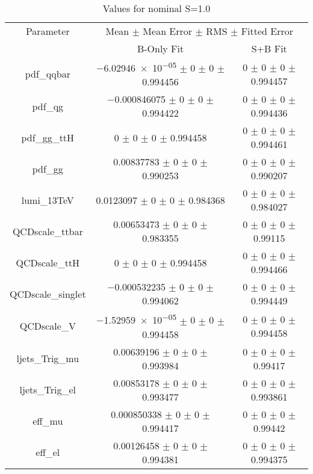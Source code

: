 \begin{table}
\centering
\caption{Values for nominal S=1.0}
\begin{tabular}{ccc}
\toprule
Parameter & \multicolumn{2}{c}{Mean $\pm$ Mean Error $\pm$ RMS $\pm$ Fitted Error}\\
 & B-Only Fit & S+B Fit\\
\midrule
pdf\_qqbar & \num{-6.02946e-05} $\pm$ \num{0} $\pm$ \num{0} $\pm$ \num{0.994456} & \num{0} $\pm$ \num{0} $\pm$ \num{0} $\pm$ \num{0.994457}\\
pdf\_qg & \num{-0.000846075} $\pm$ \num{0} $\pm$ \num{0} $\pm$ \num{0.994422} & \num{0} $\pm$ \num{0} $\pm$ \num{0} $\pm$ \num{0.994436}\\
pdf\_gg\_ttH & \num{0} $\pm$ \num{0} $\pm$ \num{0} $\pm$ \num{0.994458} & \num{0} $\pm$ \num{0} $\pm$ \num{0} $\pm$ \num{0.994461}\\
pdf\_gg & \num{0.00837783} $\pm$ \num{0} $\pm$ \num{0} $\pm$ \num{0.990253} & \num{0} $\pm$ \num{0} $\pm$ \num{0} $\pm$ \num{0.990207}\\
lumi\_13TeV & \num{0.0123097} $\pm$ \num{0} $\pm$ \num{0} $\pm$ \num{0.984368} & \num{0} $\pm$ \num{0} $\pm$ \num{0} $\pm$ \num{0.984027}\\
QCDscale\_ttbar & \num{0.00653473} $\pm$ \num{0} $\pm$ \num{0} $\pm$ \num{0.983355} & \num{0} $\pm$ \num{0} $\pm$ \num{0} $\pm$ \num{0.99115}\\
QCDscale\_ttH & \num{0} $\pm$ \num{0} $\pm$ \num{0} $\pm$ \num{0.994458} & \num{0} $\pm$ \num{0} $\pm$ \num{0} $\pm$ \num{0.994466}\\
QCDscale\_singlet & \num{-0.000532235} $\pm$ \num{0} $\pm$ \num{0} $\pm$ \num{0.994062} & \num{0} $\pm$ \num{0} $\pm$ \num{0} $\pm$ \num{0.994449}\\
QCDscale\_V & \num{-1.52959e-05} $\pm$ \num{0} $\pm$ \num{0} $\pm$ \num{0.994458} & \num{0} $\pm$ \num{0} $\pm$ \num{0} $\pm$ \num{0.994458}\\
ljets\_Trig\_mu & \num{0.00639196} $\pm$ \num{0} $\pm$ \num{0} $\pm$ \num{0.993984} & \num{0} $\pm$ \num{0} $\pm$ \num{0} $\pm$ \num{0.99417}\\
ljets\_Trig\_el & \num{0.00853178} $\pm$ \num{0} $\pm$ \num{0} $\pm$ \num{0.993477} & \num{0} $\pm$ \num{0} $\pm$ \num{0} $\pm$ \num{0.993861}\\
eff\_mu & \num{0.000850338} $\pm$ \num{0} $\pm$ \num{0} $\pm$ \num{0.994417} & \num{0} $\pm$ \num{0} $\pm$ \num{0} $\pm$ \num{0.99442}\\
eff\_el & \num{0.00126458} $\pm$ \num{0} $\pm$ \num{0} $\pm$ \num{0.994381} & \num{0} $\pm$ \num{0} $\pm$ \num{0} $\pm$ \num{0.994375}\\

\end{tabular}
\end{table}
